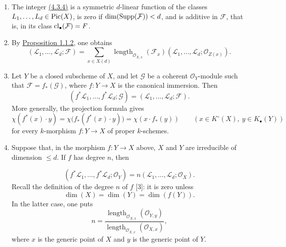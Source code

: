 \begin{enumerate}[label=\arabic*)]
\item The integer \hyperlink{sga6.e10.eq.4-3-4}{(4.3.4)} is a symmetric $d$-linear function of
  the classes $L_1,\ldots,L_d\in\operatorname{Pic}(X)$, is zero if
  $\dim(\operatorname{Supp}(\mathcal F))<d$, and is additive in $\mathcal F$, that is, in
  its class $\operatorname{cl}_\bullet(\mathcal F)=F$.

\item By \hyperlink{sga6.e10.prop.1-1-2}{Proposition 1.1.2}, one obtains
\begin{equation}\tag{4.4.1}
(\mathcal L_1,\ldots,\mathcal L_d;\mathcal F)=
\sum_{x\in X(d)}
\operatorname{length}_{\mathcal O_{X,x}}(\mathcal F_x)
(\mathcal L_1,\ldots,\mathcal L_d;\mathcal O_{Z(x)}).
\end{equation}

\item Let $Y$ be a closed subscheme of $X$, and let $\mathcal G$ be a coherent
  $\mathcal O_Y$-module such that $\mathcal F=f_*(\mathcal G)$, where
  $f:Y\to X$ is the
  canonical immersion. Then
\[
(f^*\mathcal L_1,\ldots,f^*\mathcal L_d;\mathcal G)
=(\mathcal L_1,\ldots,\mathcal L_d;\mathcal F).
\]
More generally, the projection formula gives
\begin{equation}\tag{4.4.2}
\chi(f^*(x)\cdot y)
=\chi\bigl(f_*(f^*(x)\cdot y)\bigr)
=\chi(x\cdot f_*(y))
\qquad(x\in K^\circ(X),\ y\in K_\bullet(Y))
\end{equation}
for every $k$-morphism $f:Y\to X$ of proper $k$-schemes.

\item Suppose that, in the morphism $f:Y\to X$ above, $X$ and $Y$ are
  irreducible of dimension $\leq d$. If $f$ has degree $n$, then

\begin{equation}\tag{4.4.3}
(f^*\mathcal L_1,\ldots,f^*\mathcal L_d;\mathcal O_Y)
=n(\mathcal L_1,\ldots,\mathcal L_d;\mathcal O_X).
\end{equation}
Recall the definition of the degree $n$ of $f$ [3]: it is zero unless
\[
\dim(X)=\dim(Y)=\dim(f(Y)).
\]
In the latter case, one puts
\begin{equation}\tag{4.4.4}
n=
\frac{\operatorname{length}_{\mathcal O_{X,x}}(\mathcal O_{Y,y})}
{\operatorname{length}_{\mathcal O_{X,x}}(\mathcal O_{X,x})},
\end{equation}
where $x$ is the generic point of $X$ and $y$ is the generic point of $Y$.
\end{enumerate}

